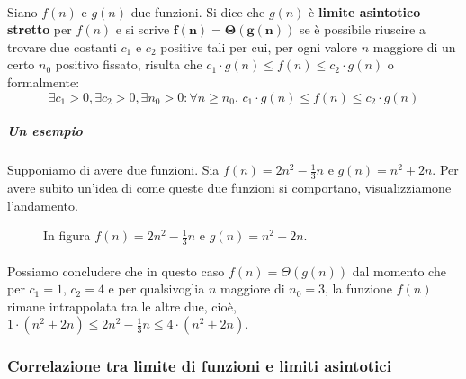 \documentclass[11pt,a4paper,oneside]{article}
\begin{document}
\paragraph{}\label{par:asymstr} Siano $f(n)$ e $g(n)$ due funzioni. Si dice che $g(n)$ è \textbf{limite asintotico stretto} per $f(n)$ e si scrive $\bm{f(n) = \Theta(g(n))}$ se è possibile riuscire a trovare due costanti $c_1$ e $c_2$ positive tali per cui, per ogni valore $n$ maggiore di un certo $n_0$ positivo fissato, risulta che $c_1\cdot g(n) \leq f(n) \leq  c_2\cdot g(n)$ o formalmente: $$\exists c_1>0, \exists c_2 > 0, \exists n_0 > 0 : \forall n \geq n_0,\,c_1\cdot g(n) \leq f(n) \leq c_2\cdot g(n)$$

\subparagraph*{Un esempio} Supponiamo di avere due funzioni. Sia $f(n) = 2n^2-\frac{1}{3}n$ e $g(n) = n^2+2n$. Per avere subito un'idea di come queste due funzioni si comportano, visualizziamone l'andamento.
\begin{figure}[hb]
	\centering
	\caption{In figura $f(n) = 2n^2-\frac{1}{3}n$ e $g(n) = n^2+2n$.}
	\label{fig:asymstr}
\end{figure}
\paragraph*{}Possiamo concludere che in questo caso $f(n) = \Theta(g(n))$ dal momento che per $c_1 = 1$, $c_2 = 4$ e per qualsivoglia $n$ maggiore di $n_0 = 3$, la funzione $f(n)$ rimane intrappolata tra le altre due, cioè, $1 \cdot (n^2+2n) \leq 2n^2-\frac{1}{3}n \leq 4 \cdot (n^2+2n)$.
\pagebreak
\subsubsection{Correlazione tra limite di funzioni e limiti asintotici}
\end{document}

